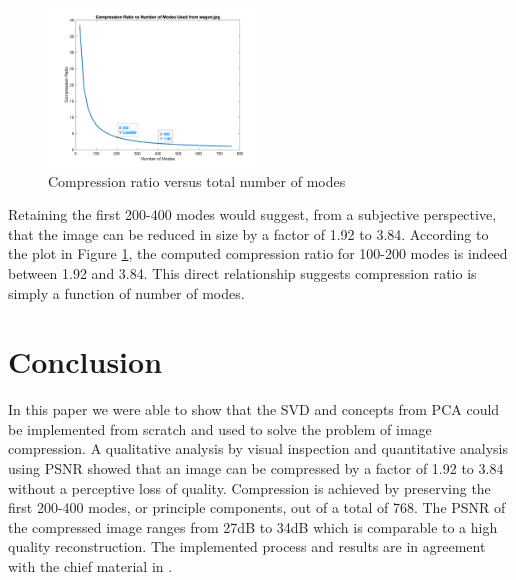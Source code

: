 \documentclass[conference]{IEEEtran}
\begin{document}
    \begin{figure}[t]
    \includegraphics[width=0.5\textwidth]{comprVsModes_rgb}
    \caption{Compression ratio versus total number of modes}
    \label{fig:comprvsr}
    \end{figure}
    
    Retaining the first 200-400 modes would suggest, from a subjective perspective, that the image can be reduced in size by a factor of 1.92 to 3.84. According to the plot in Figure \ref{fig:comprvsr}, the computed compression ratio for 100-200 modes is indeed between 1.92 and 3.84. This direct relationship suggests compression ratio is simply a function of number of modes.


    \section{Conclusion}

    In this paper we were able to show that the SVD and concepts from PCA could be implemented from scratch and used to solve the problem of image compression. A qualitative analysis by visual inspection and quantitative analysis using PSNR showed that an image can be compressed by a factor of 1.92 to 3.84 without a perceptive loss of quality. Compression is achieved by preserving the first 200-400 modes, or principle components, out of a total of 768. The PSNR of the compressed image ranges from 27dB to 34dB which is comparable to a high quality reconstruction. The implemented process and results are in agreement with the chief material in \cite{jaradet_svd_image_compression}.
    
\end{document}
